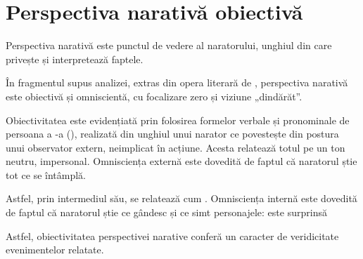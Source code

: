 \section{Perspectiva narativă obiectivă}

Perspectiva narativă este punctul de vedere al naratorului, unghiul din care privește și interpretează faptele.

În fragmentul supus analizei, extras din opera literară  de , perspectiva narativă este obiectivă și omniscientă, cu focalizare zero și viziune „dindărăt”.

Obiectivitatea este evidențiată prin folosirea formelor verbale și pronominale de persoana a -a (), realizată din unghiul unui narator ce povestește din postura unui observator extern, neimplicat în acțiune. Acesta relatează totul pe un ton neutru, impersonal. Omnisciența externă este dovedită de faptul că naratorul știe tot ce se întâmplă.

Astfel, prin intermediul său, se relatează cum . Omnisciența internă este dovedită de faptul că naratorul știe ce gândesc și ce simt personajele: este surprinsă 

Astfel, obiectivitatea perspectivei narative conferă un caracter de veridicitate evenimentelor relatate.
